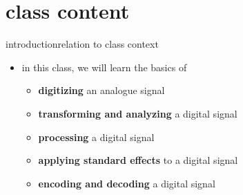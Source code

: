 \section{class content}
\begin{frame}{introduction}{relation to class context}
	\begin{itemize}
		\item	in this class, we will learn the basics of
            \begin{itemize}
                \item   \textbf{digitizing} an analogue signal
                \item   \textbf{transforming and analyzing} a digital signal
                \item   \textbf{processing} a digital signal
                \item   \textbf{applying standard effects} to a digital signal
                \item   \textbf{encoding and decoding} a digital signal
            \end{itemize}
	\end{itemize}
\end{frame}




